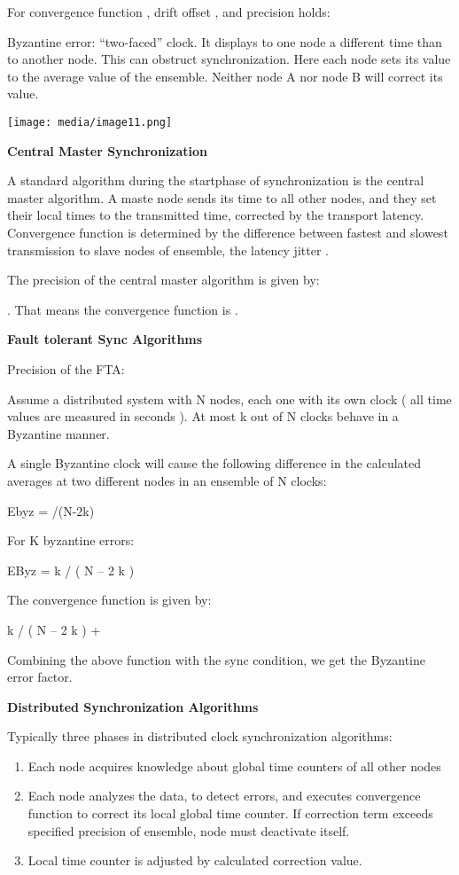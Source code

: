 For convergence function , drift offset , and precision holds:

Byzantine error: ``two-faced'' clock. It displays to one node a
different time than to another node. This can obstruct synchronization.
Here each node sets its value to the average value of the ensemble.
Neither node A nor node B will correct its value.

\texttt{[image: media/image11.png]}

\textbf{Central Master Synchronization}

A standard algorithm during the startphase of synchronization is the
central master algorithm. A maste node sends its time to all other
nodes, and they set their local times to the transmitted time, corrected
by the transport latency. Convergence function is determined by the
difference between fastest and slowest transmission to slave nodes of
ensemble, the latency jitter .

The precision of the central master algorithm is given by:

. That means the convergence function is .

\textbf{Fault tolerant Sync Algorithms}

Precision of the FTA:

Assume a distributed system with N nodes, each one with its own clock (
all time values are measured in seconds ). At most k out of N clocks
behave in a Byzantine manner.

A single Byzantine clock will cause the following difference in the
calculated averages at two different nodes in an ensemble of N clocks:

Ebyz = /(N-2k)

For K byzantine errors:

EByz = k / ( N -- 2 k )

The convergence function is given by:

k / ( N -- 2 k ) +

Combining the above function with the sync condition, we get the
Byzantine error factor.

\textbf{Distributed Synchronization Algorithms}

Typically three phases in distributed clock synchronization algorithms:

\begin{enumerate}
\def\labelenumi{\arabic{enumi}.}
\item
  Each node acquires knowledge about global time counters of all other
  nodes
\item
  Each node analyzes the data, to detect errors, and executes
  convergence function to correct its local global time counter. If
  correction term exceeds specified precision of ensemble, node must
  deactivate itself.
\item
  Local time counter is adjusted by calculated correction value.
\end{enumerate}

